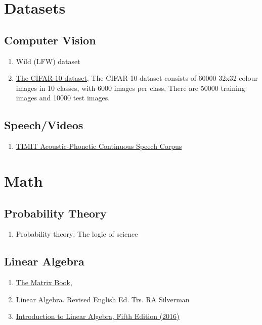 \documentclass{article}
\begin{document}
\section{Datasets}
\subsection{Computer Vision}
\begin{enumerate}
	\item Wild (LFW) dataset
	\item \href{http://www.cs.toronto.edu/~kriz/cifar.html}{The CIFAR-10 dataset}, The CIFAR-10 dataset consists of 60000 32x32 colour images in 10 classes, with 6000 images per class. There are 50000 training images and 10000 test images.
\end{enumerate}
\subsection{Speech/Videos}
\begin{enumerate}
	\item \href{https://catalog.ldc.upenn.edu/ldc93s1}{TIMIT Acoustic-Phonetic Continuous Speech Corpus}
\end{enumerate}


\section{Math}
\subsection{Probability Theory}
\begin{enumerate}
	\item Probability theory: The logic of science\autocite{jaynes2003probability}
\end{enumerate}

\subsection{Linear Algebra}
\begin{enumerate}
	\item \href{http://www.math.uwaterloo.ca/~hwolkowi/matrixcookbook.pdf}{The Matrix Book},\autocite{petersen2008matrix}
	\item Linear Algebra. Revised English Ed. Trs. RA Silverman\autocite{shilov1971linear}
	\item \href{http://math.mit.edu/~gs/linearalgebra/}{Introduction to Linear Algebra, Fifth Edition (2016)}
\end{enumerate}
\end{document}
